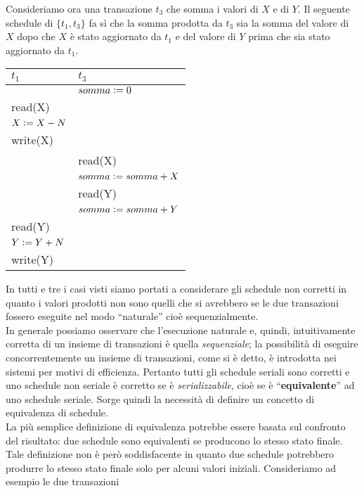 Consideriamo ora una transazione $t_3$ che somma i valori di $X$ e di $Y$. Il seguente schedule di
$\{t_1, t_3\}$ fa sì che la somma prodotta da $t_3$ sia la somma del valore di $X$ dopo che $X$ è stato
aggiornato da $t_1$ e del valore di $Y$ prima che sia stato aggiornato da $t_1$.
\begin{center}
   \begin{tabular}{|l|l|}
     \hline
     $t_1$ & $t_3$\\
     \hline
     & $somma\vcentcolon=0$\\
     read(X) & \\ 
     $X\vcentcolon=X-N$ & \\ 
     write(X) &\\ 
      & read(X)\\
      & $somma\vcentcolon=somma + X$\\ 
      & read(Y)\\
      & $somma\vcentcolon= somma + Y$\\
     read(Y) &\\
     $Y\vcentcolon=Y+N$ &\\
     write(Y)&\\
     \hline
    \end{tabular}
\end{center}
In tutti e tre i casi visti siamo portati a considerare gli schedule non corretti in quanto i valori
prodotti non sono quelli che si avrebbero se le due transazioni fossero eseguite nel modo ``naturale''
cioè sequenzialmente.\\
In generale possiamo osservare che l'esecuzione naturale e, quindi, intuitivamente corretta di un
insieme di transazioni è quella \emph{sequenziale}; la possibilità di eseguire concorrentemente un insieme
di transazioni, come si è detto, è introdotta nei sistemi per motivi di efficienza. Pertanto tutti gli
schedule seriali sono corretti e uno schedule non seriale è corretto se è \emph{serializzabile}, cioè se è
``\textbf{equivalente}'' ad uno schedule seriale. Sorge quindi la necessità di definire un concetto di
equivalenza di schedule.\\
La più semplice definizione di equivalenza potrebbe essere basata sul confronto del risultato: due
schedule sono equivalenti se producono lo stesso stato finale. Tale definizione non è però
soddisfacente in quanto due schedule potrebbero produrre lo stesso stato finale solo per alcuni
valori iniziali. Consideriamo ad esempio le due transazioni 

